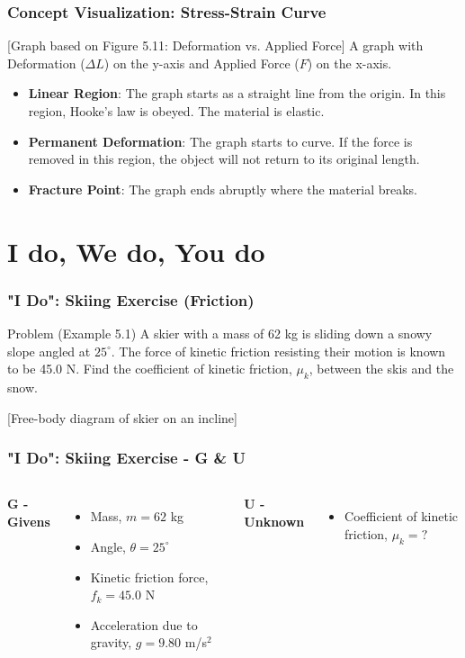 \documentclass{beamer}
\begin{document}
\begin{frame}
\frametitle{Concept Visualization: Stress-Strain Curve}
\begin{alertblock}{[Graph based on Figure 5.11: Deformation vs. Applied Force]}
A graph with Deformation ($\Delta L$) on the y-axis and Applied Force ($F$) on the x-axis.
\begin{itemize}
    \item \textbf{Linear Region}: The graph starts as a straight line from the origin. In this region, Hooke's law is obeyed. The material is elastic. \pause
    \item \textbf{Permanent Deformation}: The graph starts to curve. If the force is removed in this region, the object will not return to its original length. \pause
    \item \textbf{Fracture Point}: The graph ends abruptly where the material breaks.
\end{itemize}
\end{alertblock}
\end{frame}

\section{I do, We do, You do}

\begin{frame}
\frametitle{"I Do": Skiing Exercise (Friction)}
\begin{block}{Problem (Example 5.1)}
A skier with a mass of 62 kg is sliding down a snowy slope angled at $25^\circ$. The force of kinetic friction resisting their motion is known to be 45.0 N.
\newline\newline
Find the coefficient of kinetic friction, $\mu_k$, between the skis and the snow.
\end{block}
\begin{center}
\alert{[Free-body diagram of skier on an incline]}
\end{center}
\end{frame}

\begin{frame}
\frametitle{"I Do": Skiing Exercise - G \& U}
\begin{columns}[T]
\textbf{G - Givens}
\begin{itemize}
    \item Mass, $m = 62$ kg
    \item Angle, $\theta = 25^\circ$
    \item Kinetic friction force, $f_k = 45.0$ N
    \item Acceleration due to gravity, $g = 9.80$ m/s$^2$
\end{itemize}

\textbf{U - Unknown}
\begin{itemize}
    \item Coefficient of kinetic friction, $\mu_k = ?$
\end{itemize}
\end{columns}
\end{frame}
\end{document}
